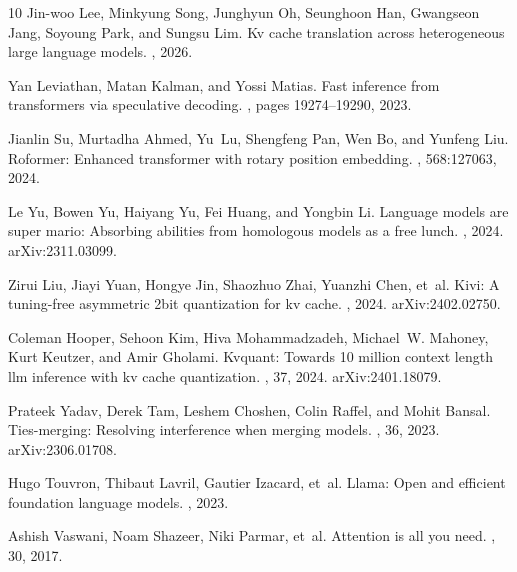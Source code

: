 \documentclass[11pt]{article}
\begin{document}
\begin{thebibliography}{10}
Jin-woo Lee, Minkyung Song, Junghyun Oh, Seunghoon Han, Gwangseon Jang, Soyoung
  Park, and Sungsu Lim.
\newblock Kv cache translation across heterogeneous large language models.
, 2026.

Yan Leviathan, Matan Kalman, and Yossi Matias.
\newblock Fast inference from transformers via speculative decoding.
, pages
  19274--19290, 2023.

Jianlin Su, Murtadha Ahmed, Yu~Lu, Shengfeng Pan, Wen Bo, and Yunfeng Liu.
\newblock Roformer: Enhanced transformer with rotary position embedding.
, 568:127063, 2024.

Le Yu, Bowen Yu, Haiyang Yu, Fei Huang, and Yongbin Li.
\newblock Language models are super mario: Absorbing abilities from homologous
  models as a free lunch.
, 2024.
\newblock arXiv:2311.03099.

Zirui Liu, Jiayi Yuan, Hongye Jin, Shaozhuo Zhai, Yuanzhi Chen, et~al.
\newblock Kivi: A tuning-free asymmetric 2bit quantization for kv cache.
, 2024.
\newblock arXiv:2402.02750.

Coleman Hooper, Sehoon Kim, Hiva Mohammadzadeh, Michael~W. Mahoney,
  Kurt Keutzer, and Amir Gholami.
\newblock Kvquant: Towards 10 million context length llm inference with
  kv cache quantization.
, 37, 2024.
\newblock arXiv:2401.18079.

Prateek Yadav, Derek Tam, Leshem Choshen, Colin Raffel, and Mohit Bansal.
\newblock Ties-merging: Resolving interference when merging models.
, 36, 2023.
\newblock arXiv:2306.01708.

Hugo Touvron, Thibaut Lavril, Gautier Izacard, et~al.
\newblock Llama: Open and efficient foundation language models.
, 2023.

Ashish Vaswani, Noam Shazeer, Niki Parmar, et~al.
\newblock Attention is all you need.
, 30, 2017.


\end{thebibliography}
\end{document}
